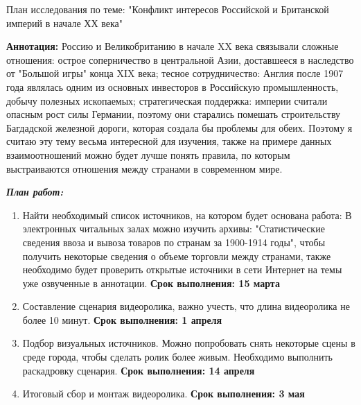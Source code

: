 \documentclass[a4paper, 12pt]{article}
\begin{document}
	\begin{center}
		\large План исследования по теме: "Конфликт интересов Российской и Британской империй в начале ХХ века"
	\end{center}
	
	\textbf{Аннотация: } Россию и Великобританию в начале XX века связывали сложные отношения: острое соперничество в центральной Азии, доставшееся в наследство от "Большой игры" конца XIX века; тесное сотрудничество: Англия после 1907 года являлась одним из основных инвесторов в Российскую промышленность, добычу полезных ископаемых; стратегическая поддержка: империи считали опасным рост силы Германии, поэтому они старались помешать строительству Багдадской железной дороги, которая создала бы проблемы для обеих. Поэтому я считаю эту тему весьма интересной для изучения, также на примере данных взаимоотношений можно будет лучше понять правила, по которым выстраиваются отношения между странами в современном мире.
	
	
	\textbf{\textit{План работ:}} 
	\begin{enumerate}
		\item Найти необходимый список источников, на котором будет основана работа: В электронных читальных залах можно изучить архивы: "Статистические сведения ввоза и вывоза товаров по странам за 1900-1914 годы", чтобы получить некоторые сведения о объеме торговли между странами, также необходимо будет проверить открытые источники в сети Интернет на темы уже озвученные в аннотации. \textbf{Срок выполнения: 15 марта}
		\item Составление сценария видеоролика, важно учесть, что длина видеоролика не более 10 минут. \textbf{Срок выполнения: 1 апреля}
		\item Подбор визуальных источников. Можно попробовать снять некоторые сцены в среде города, чтобы сделать ролик более живым. Необходимо выполнить раскадровку сценария. \textbf{Срок выполнения: 14 апреля} 
		\item Итоговый сбор и монтаж видеоролика. \textbf{Срок выполнения: 3 мая}
		
	\end{enumerate}
	
\end{document}
